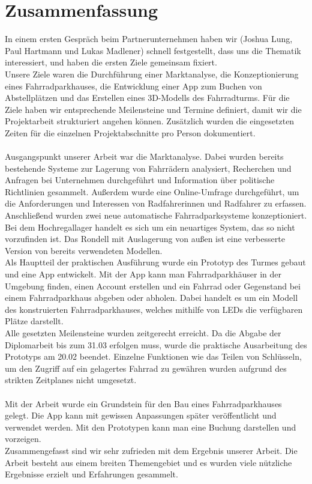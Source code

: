\section{Zusammenfassung}

In einem ersten Gespräch beim Partnerunternehmen haben wir (Joshua Lung, Paul Hartmann und Lukas Madlener) schnell festgestellt, dass uns die Thematik interessiert, und haben die ersten Ziele gemeinsam fixiert. \\
Unsere Ziele waren die Durchführung einer Marktanalyse, die Konzeptionierung eines Fahrradparkhauses, die Entwicklung einer App zum Buchen von Abstellplätzen und das Erstellen eines 3D-Modells des Fahrradturms. Für die Ziele haben wir entsprechende Meilensteine und Termine definiert, damit wir die Projektarbeit strukturiert angehen können. Zusätzlich wurden die eingesetzten Zeiten für die einzelnen Projektabschnitte pro Person dokumentiert.\\ \\
Ausgangspunkt unserer Arbeit war die Marktanalyse. Dabei wurden bereits bestehende Systeme zur Lagerung von Fahrrädern analysiert, Recherchen und Anfragen bei Unternehmen durchgeführt und Information über politische Richtlinien gesammelt. Außerdem wurde eine Online-Umfrage durchgeführt, um die Anforderungen und Interessen von Radfahrerinnen und Radfahrer zu erfassen.\\
Anschließend wurden zwei neue automatische Fahrradparksysteme konzeptioniert. Bei dem Hochregallager handelt es sich um ein neuartiges System, das so nicht vorzufinden ist. Das Rondell mit Auslagerung von außen ist eine verbesserte Version von bereits verwendeten Modellen.\\
Als Hauptteil der praktischen Ausführung wurde ein Prototyp des Turmes gebaut und eine App entwickelt. Mit der App kann man Fahrradparkhäuser in der Umgebung finden, einen Account erstellen und ein Fahrrad oder Gegenstand bei einem Fahrradparkhaus abgeben oder abholen. Dabei handelt es um ein Modell des konstruierten Fahrradparkhauses, welches mithilfe von LEDs die verfügbaren Plätze darstellt. \\
Alle gesetzten Meilensteine wurden zeitgerecht erreicht. Da die Abgabe der Diplomarbeit bis zum 31.03 erfolgen muss, wurde die praktische Ausarbeitung des Prototyps am 20.02 beendet. Einzelne Funktionen wie das Teilen von Schlüsseln, um den Zugriff auf ein gelagertes Fahrrad zu gewähren wurden aufgrund des strikten Zeitplanes nicht umgesetzt.\\ \\

Mit der Arbeit wurde ein Grundstein für den Bau eines Fahrradparkhauses gelegt. Die App kann mit gewissen Anpassungen später veröffentlicht und verwendet werden. Mit den Prototypen kann man eine Buchung darstellen und vorzeigen.\\
Zusammengefasst sind wir sehr zufrieden mit dem Ergebnis unserer Arbeit. Die Arbeit besteht aus einem breiten Themengebiet und es wurden viele nützliche Ergebnisse erzielt und Erfahrungen gesammelt.\\
